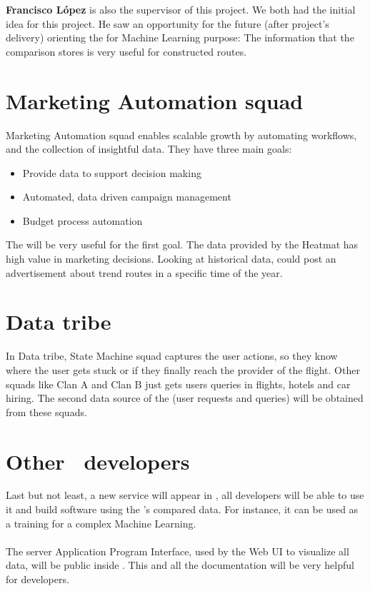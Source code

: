 \textbf{Francisco López} is also the supervisor of this project. We both had the initial idea for this project. He saw an opportunity for the future (after project's delivery) orienting the \thesistitle for Machine Learning purpose: The information that the comparison stores is very useful for constructed routes.

\section{Marketing Automation squad} \label{mas}

Marketing Automation squad enables scalable growth by automating workflows, and the collection of insightful data. They have three main goals:

\begin{itemize}
  \item Provide data to support decision making
  \item Automated, data driven campaign management
  \item Budget process automation
\end{itemize}

The \thesistitle will be very useful for the first goal. The data provided by the Heatmat has high value in marketing decisions. Looking at historical data,  could post an advertisement about trend routes in a specific time of the year.

\section{Data tribe}

In Data tribe, State Machine squad captures the user actions, so they know where the user gets stuck or if they finally reach the provider of the flight. Other squads like Clan A and Clan B just gets users queries in flights, hotels and car hiring. The second data source of the \thesistitle (user requests and queries) will be obtained from these squads.

\section{Other \company\ developers}

Last but not least, a new service will appear in \company, all developers will be able to use it and build software using the \thesistitle's compared data. For instance, it can be used as a training for a complex Machine Learning\cite{machine_learning_coursera}.
\\\\
The server Application Program Interface, used by the Web UI to visualize all data, will be public inside \company. This and all the documentation will be very helpful for developers.

